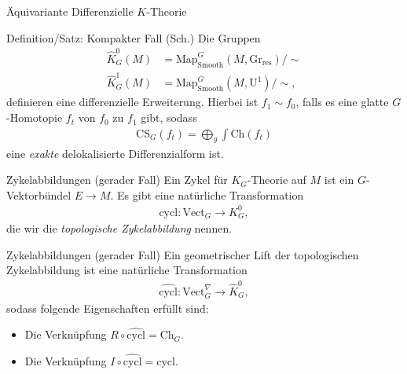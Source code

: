 \documentclass[12pt,utf8,notheorems,compress,t]{beamer}
\renewcommand{\_}{\mathpunct{.}}
\newcommand{\?}{\,{:}\,}
\newcommand{\Ch}{\mathrm{Ch}}
\newcommand{\CS}{\mathrm{CS}}
\newcommand{\grres}{\mathrm{Gr}_{\mathrm{res}}}
\begin{document}
\begin{frame}{Äquivariante Differenzielle $K$-Theorie}
    \begin{block}{Definition/Satz: Kompakter Fall (Sch.)}
        Die Gruppen
        \begin{align*}
            \hat K_G^0(M) &= \textrm{Map}^G_{\mathrm{Smooth}}(M, \grres)/\sim\\
            \hat K_G^{1}(M) &= \textrm{Map}^G_{\mathrm{Smooth}}(M, \mathrm
            U^1)/\sim,
        \end{align*}
        definieren eine differenzielle Erweiterung. Hierbei ist $f_1 \sim f_0$, 
        falls es eine glatte $G$-Homotopie $f_t$ von $f_0$ zu $f_1$ gibt, sodass
        \begin{align*}
            \CS_G(f_t) = \bigoplus_g \int \Ch(f_t) 
        \end{align*}
        eine \emph{exakte} delokalisierte Differenzialform ist.
    \end{block}
\end{frame}
\begin{frame}{Zykelabbildungen (gerader Fall)}
    Ein Zykel für $K_G$-Theorie auf $M$ ist ein $G$-Vektorbündel $E\to M$. Es
    gibt eine natürliche Transformation
    \begin{align*}
        \mathrm{cycl}\colon \mathrm{Vect}_G\to K_G^0,
    \end{align*}
    die wir die \emph{topologische Zykelabbildung} nennen.

\end{frame}
\begin{frame}{Zykelabbildungen (gerader Fall)}
    Ein geometrischer Lift der topologischen Zykelabbildung ist eine natürliche
    Transformation
    \begin{align*}
        \widehat{\mathrm{cycl}}\colon \mathrm{Vect}^{\nabla}_G\to \hat K_G^0,
    \end{align*}
    sodass folgende Eigenschaften erfüllt sind:
    \begin{itemize}
        \item<2-> Die Verknüpfung $R\circ \widehat{\mathrm{cycl}} =
            \mathrm{Ch}_G$.
        \item<2-> Die Verknüpfung $I\circ \widehat{\mathrm{cycl}} =
            \mathrm{cycl}$.
    \end{itemize}
\end{frame}
\end{document}
